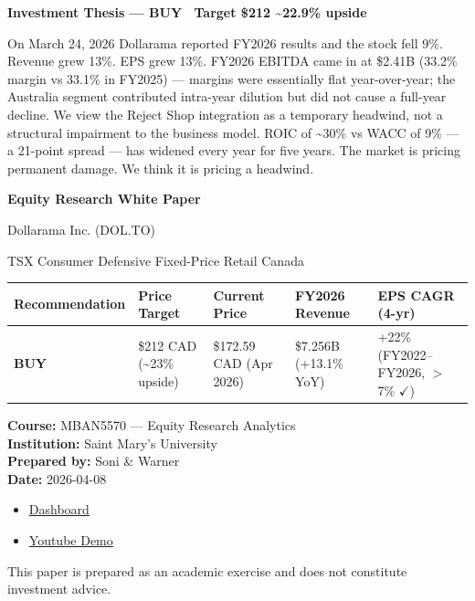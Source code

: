 \documentclass[11pt]{article}
\newcommand{\thesisbox}{%
\noindent
\colorbox{navybg}{%
\parbox{\dimexpr\linewidth-2\fboxsep\relax}{%
\vspace{0.75em}
{\color{accentred}\Large\bfseries Investment Thesis --- BUY \textperiodcentered\ Target \$212 \textasciitilde{}22.9\% upside}\par
\vspace{0.9em}
{\color{white}\normalsize On March 24, 2026 Dollarama reported FY2026 results and the stock fell 9\%. Revenue grew 13\%. EPS grew 13\%. FY2026 EBITDA came in at \$2.41B (33.2\% margin vs 33.1\% in FY2025) --- margins were essentially flat year-over-year; the Australia segment contributed intra-year dilution but did not cause a full-year decline. We view the Reject Shop integration as a temporary headwind, not a structural impairment to the business model. ROIC of \textasciitilde{}30\% vs WACC of 9\% --- a 21-point spread --- has widened every year for five years. The market is pricing permanent damage. We think it is pricing a headwind.}
\vspace{0.75em}}}
}
\begin{document}
\begin{titlepage}
\thispagestyle{empty}
\thesisbox

\vspace{1.1cm}

{\LARGE\bfseries Equity Research White Paper\par}
\vspace{0.25cm}
{\Large Dollarama Inc. (DOL.TO)\par}
\vspace{0.15cm}
{\normalsize TSX \textbar{} Consumer Defensive \textbar{} Fixed-Price Retail \textbar{} Canada\par}

\vspace{0.6cm}

\begin{center}
\renewcommand{\arraystretch}{1.3}
\begin{tabularx}{0.95\linewidth}{>{\bfseries}Y C{2.2cm} C{2.4cm} C{2.8cm} C{2.6cm}}
\toprule
Recommendation & Price Target & Current Price & FY2026 Revenue & EPS CAGR (4-yr)\\
\midrule
BUY & \$212 CAD (\textasciitilde{}23\% upside) & \$172.59 CAD (Apr 2026) & \$7.256B (+13.1\% YoY) & +22\% (FY2022--FY2026, $>$7\% $\checkmark$)\\
\bottomrule
\end{tabularx}
\end{center}

\vfill

\begin{flushleft}
\textbf{Course:} MBAN5570 --- Equity Research Analytics\\
\textbf{Institution:} Saint Mary's University\\
\textbf{Prepared by:} Soni \& Warner\\
\textbf{Date:} 2026-04-08\\[0.6em]
\begin{itemize}
    \item \href{https://dollarama-equity-research.streamlit.app/}{Dashboard}
    \item \href{https://youtu.be/0xYxGSXXuGI}{Youtube Demo}
\end{itemize}
This paper is prepared as an academic exercise and does not constitute investment advice.
\end{flushleft}
\end{titlepage}
\end{document}
